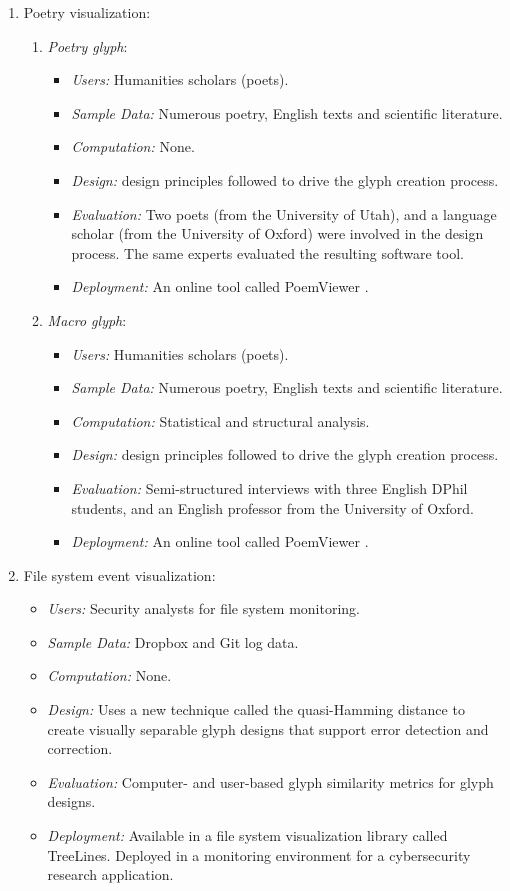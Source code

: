 \begin{enumerate}
\begin{enumerate}
\item Poetry visualization:
\begin{enumerate}
\item \emph{Poetry glyph}:
\begin{itemize}
\item \emph{Users:} Humanities scholars (poets).
\item \emph{Sample Data:} Numerous poetry, English texts and scientific literature.
\item \emph{Computation:} None.
\item \emph{Design:} design principles followed to drive the glyph creation process.
\item \emph{Evaluation:} Two poets (from the University of Utah), and a language scholar (from the University of Oxford) were involved in the design process.
The same experts evaluated the resulting software tool.
\item \emph{Deployment:} An online tool called PoemViewer \cite{CGF:Abd2013a}.
\end{itemize}
\item \emph{Macro glyph}:
\begin{itemize}
\item \emph{Users:} Humanities scholars (poets).
\item \emph{Sample Data:} Numerous poetry, English texts and scientific literature.
\item \emph{Computation:} Statistical and structural analysis.
\item \emph{Design:} design principles followed to drive the glyph creation process.
\item \emph{Evaluation:} Semi-structured interviews with three English DPhil students, and an English professor from the University of Oxford.
\item \emph{Deployment:} An online tool called PoemViewer \cite{CGF:Abd2013a}.

\end{itemize}
\end{enumerate}

\item File system event visualization:
\begin{itemize}
\item \emph{Users:} Security analysts for file system monitoring.
\item \emph{Sample Data:} Dropbox and Git log data.
\item \emph{Computation:} None.
\item \emph{Design:} Uses a new technique called the quasi-Hamming distance to create visually separable glyph designs that support error detection and correction.
\item \emph{Evaluation:} Computer- and user-based glyph similarity metrics for glyph designs.
\item \emph{Deployment:} Available in a file system visualization library called TreeLines. Deployed in a monitoring environment for a cybersecurity research application.
\end{itemize}
\end{enumerate}


\end{enumerate}